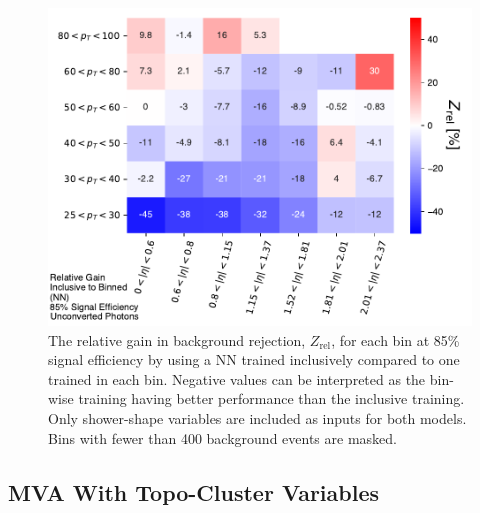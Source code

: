 \begin{figure}[!htbp]
    \centering
    \includegraphics[width=.85\textwidth]{chapters/chapter4_photonID/images/NNinclusive_v_NN_normed.pdf}
    \caption[The relative gain in background rejection by using a \gls{NN} trained inclusively compared to one trained bin-wise]
    {The relative gain in background rejection, $Z_{\text{rel}}$, for each \etaPt bin at 85\% signal efficiency by using a \gls{NN} trained inclusively compared to one trained in each \etaPt bin. Negative values can be interpreted as the bin-wise training having better performance than the inclusive training. Only shower-shape variables are included as inputs for both models. Bins with fewer than 400 background events are masked.}
    \label{fig:nninclusive-v-binned}
\end{figure}



\subsection{MVA With Topo-Cluster Variables}

